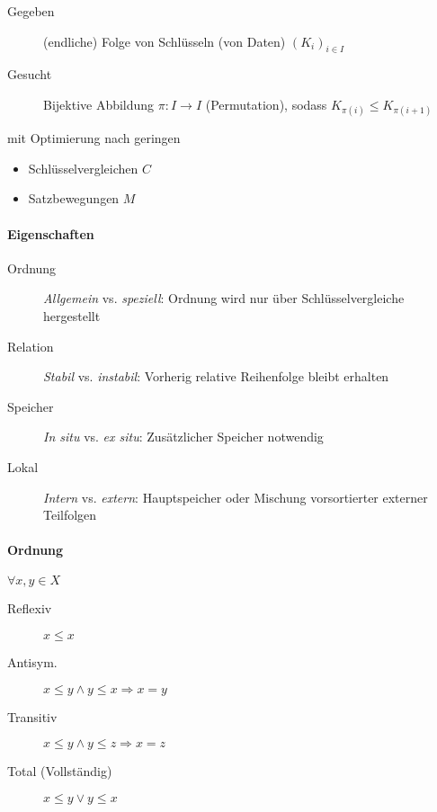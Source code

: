 \begin{description}
  \item[Gegeben] (endliche) Folge von Schlüsseln (von Daten) $(K_i)_{i \in I}$
  \item[Gesucht] Bijektive Abbildung $\pi: I \rightarrow I$ (Permutation), sodass $K_{\pi(i)} \leq K_{\pi(i + 1)}$
\end{description}

mit Optimierung nach geringen

\begin{itemize}
  \item Schlüsselvergleichen $C$
  \item Satzbewegungen $M$
\end{itemize}

\paragraph{Eigenschaften}

\begin{description}
  \item [Ordnung] \emph{Allgemein} vs. \emph{speziell}: Ordnung wird nur über Schlüsselvergleiche hergestellt
  \item [Relation] \emph{Stabil} vs. \emph{instabil}: Vorherig relative Reihenfolge bleibt erhalten
  \item [Speicher] \emph{In situ} vs. \emph{ex situ}: Zusätzlicher Speicher notwendig
  \item [Lokal] \emph{Intern} vs. \emph{extern}: Hauptspeicher oder Mischung vorsortierter externer Teilfolgen
\end{description}

\paragraph{Ordnung} $\forall x, y \in X$

\begin{description}
  \item[Reflexiv] $x \leq x$
  \item[Antisym.] $x \leq y \land y \leq x \Rightarrow x = y$
  \item[Transitiv] $x \leq y \land y \leq z \Rightarrow x = z$
  \item[Total (Vollständig)] $x \leq y \lor y \leq x$
\end{description}


